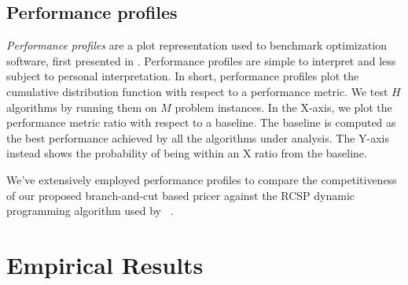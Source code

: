 \subsection{Performance profiles}
\label{sec:results-performance-profiles}

\textit{Performance profiles} are a plot representation used to benchmark optimization software,
first presented in \textcite{dolan2002}.
Performance profiles are simple to interpret and less subject to personal interpretation.
In short, performance profiles plot the cumulative distribution function with respect to a performance metric.
We test $H$ algorithms by running them on $M$ problem instances.
In the X-axis, we plot the performance metric ratio with respect to a baseline.
The baseline is computed as the best performance achieved by all the algorithms under analysis.
The Y-axis instead shows the probability of being within an X ratio from the baseline.

\medskip

We've extensively employed performance profiles to compare the competitiveness of
our proposed branch-and-cut based pricer
against the RCSP dynamic programming algorithm used by \bapcod\ \parencite{pessoa2020generic}.

\begin{comment}
In this thesis, we will use performance profiles extensively to measure each solver by exploiting two performance metrics: \textbf{Time metric}, \textbf{Cost metric}.

A \textbf{Time performance profile} will tell us which resolution method is the fastest in terms of runtime.
A \textbf{Cost performance profile}, instead, will show us the cost ratio of the best upper bound obtained from each resolution method.
The ground truth optimal, as extracted from the dataset, is used instead as the cost baseline.
\end{comment}

\section{Empirical Results}
\label{sec:results-empirical-results}




